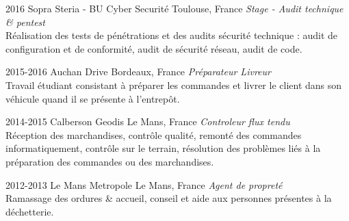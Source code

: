 \documentclass[]{friggeri-cv} %
\begin{document}
\begin{entrylist}

\entry
{2016}
{Sopra Steria - BU Cyber Securité}
{Toulouse, France}
{\emph{Stage - Audit technique \& pentest} \\
Réalisation des tests de pénétrations et des audits sécurité technique : audit de configuration et de conformité, audit de sécurité réseau, audit de code.}


\entry
{2015-2016}
{Auchan Drive}
{Bordeaux, France}
{\emph{Préparateur Livreur} \\
Travail étudiant consistant à préparer les commandes et livrer le client dans son véhicule quand il se présente à l'entrepôt.}


\entry
{2014-2015}
{Calberson Geodis}
{Le Mans, France}
{\emph{Controleur flux tendu} \\
Réception des marchandises, contrôle qualité, remonté des commandes informatiquement,  contrôle sur le terrain, résolution des problèmes liés à la préparation des commandes ou des marchandises.}




\entry
{2012-2013}
{Le Mans Metropole}
{Le Mans, France}
{\emph{Agent de propreté} \\
Ramassage des ordures \& accueil, conseil et aide aux personnes présentes à la déchetterie.}


\end{entrylist}



\end{document}
